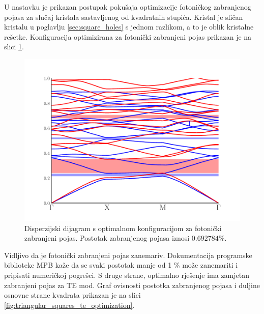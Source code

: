 \documentclass[utf8, seminar, numeric]{fer}
\begin{document}
U nastavku je prikazan postupak pokušaja optimizacije fotoničkog zabranjenog
pojasa za slučaj kristala sastavljenog od kvadratnih stupića. Kristal je
sličan kristalu u poglavlju \ref{sec:square_holes} s jednom razlikom, a to je
oblik kristalne rešetke. Konfiguracija optimizirana za fotonički zabranjeni
pojas prikazan je na slici \ref{fig:triangular_squares_optimization}.

\begin{figure}[ht]
	\centering
	\includegraphics[width=0.9\linewidth]
		{./images/pdf/triangular_lattice_squares_band_diag_max.pdf}
	\caption{Disperzijski dijagram s optimalnom konfiguracijom za fotonički
	zabranjeni pojas. Postotak zabranjenog pojasa iznosi $0.692784 \%$.}
	\label{fig:triangular_squares_optimization}
\end{figure}



\FloatBarrier

Vidljivo da je fotonički zabranjeni pojas zanemariv.
Dokumentacija programske biblioteke MPB kaže da se svaki postotak manje od 1 \%
može zanemariti i pripisati numeričkoj pogrešci. S druge strane, optimalno
rješenje ima zamjetan zabranjeni pojas za TE mod. Graf ovisnosti postotka
zabranjenog pojasa i duljine osnovne strane kvadrata prikazan je na slici
\ref{fig:triangular_squares_te_optimization}.
\end{document}
